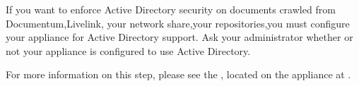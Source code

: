 %
%

If you want to enforce Active Directory security on documents crawled
from \ifDocumentumGuide Documentum,\fi \ifLivelinkGuide Livelink,\fi
\ifShareGuide your network share,\fi \ifCombinedConnectorGuide your
repositories,\fi you must configure your appliance for Active
Directory support. Ask your administrator whether or not your
appliance is configured to use Active Directory.

For more information on this step, please see the , located on the appliance at
\linebreak{}.
